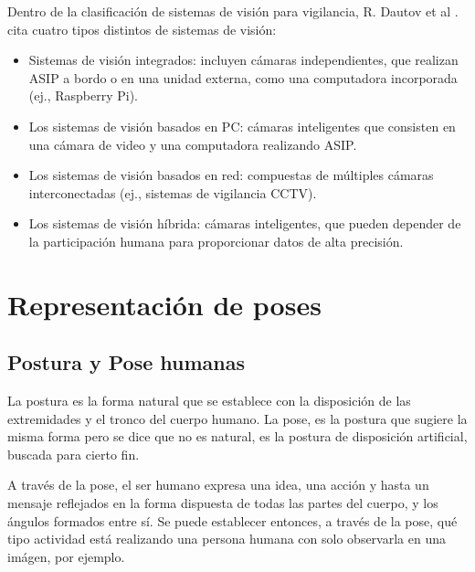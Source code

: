 \documentclass[a4paper,12pt,oneside,spanish]{book}
\begin{document}
Dentro de la clasificación de sistemas de visión para vigilancia, R. Dautov et al \cite{dautov}. cita cuatro tipos distintos de sistemas de visión:
\begin{itemize}
	\item Sistemas de visión integrados: incluyen cámaras independientes, que realizan ASIP a bordo o en una unidad externa, como una computadora incorporada (ej., Raspberry Pi).\\	
	\item Los sistemas de visión basados en PC: cámaras inteligentes que consisten en una cámara de video y una computadora  realizando ASIP.\\	
	\item Los sistemas de visión basados en red: compuestas de múltiples cámaras interconectadas (ej., sistemas de vigilancia CCTV).\\	
	\item Los sistemas de visión híbrida: cámaras inteligentes, que pueden depender de la participación humana para proporcionar datos de alta precisión.\\	
\end{itemize}

\newpage
\chapter{Representación de poses}
\section{Postura y Pose humanas}

La postura es la forma natural que se establece con la disposición de las extremidades y el tronco del cuerpo humano. La pose, es la postura que sugiere la misma forma pero se dice que no es natural, es la postura de disposición artificial, buscada para cierto fin. \par

A través de la pose, el ser humano expresa una idea, una acción y hasta un mensaje reflejados en la forma dispuesta de todas las partes del cuerpo, y los ángulos formados entre sí. Se puede establecer entonces, a través de la pose, qué tipo actividad está realizando una persona humana con solo observarla en una imágen, por ejemplo. \par
\end{document}
